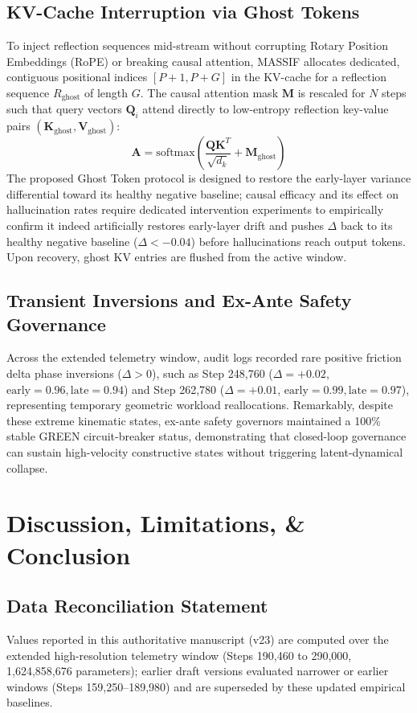 \documentclass[11pt]{article}
\begin{document}
\subsection{KV-Cache Interruption via Ghost Tokens}
To inject reflection sequences mid-stream without corrupting Rotary Position Embeddings (RoPE) or breaking causal attention, MASSIF allocates dedicated, contiguous positional indices $[P+1, P+G]$ in the KV-cache for a reflection sequence $R_{\text{ghost}}$ of length $G$. The causal attention mask $\mathbf{M}$ is rescaled for $N$ steps such that query vectors $\mathbf{Q}_i$ attend directly to low-entropy reflection key-value pairs $(\mathbf{K}_{\text{ghost}}, \mathbf{V}_{\text{ghost}})$:
\begin{equation}
\mathbf{A} = \text{softmax}\left( \frac{\mathbf{Q} \mathbf{K}^T}{\sqrt{d_k}} + \mathbf{M}_{\text{ghost}} \right)
\end{equation}
The proposed Ghost Token protocol is designed to restore the early-layer variance differential toward its healthy negative baseline; causal efficacy and its effect on hallucination rates require dedicated intervention experiments to empirically confirm it indeed artificially restores early-layer drift and pushes $\Delta$ back to its healthy negative baseline ($\Delta < -0.04$) before hallucinations reach output tokens. Upon recovery, ghost KV entries are flushed from the active window.

\subsection{Transient Inversions and Ex-Ante Safety Governance}
Across the extended telemetry window, audit logs recorded rare positive friction delta phase inversions ($\Delta > 0$), such as Step 248,760 ($\Delta = +0.02$, $\text{early}=0.96, \text{late}=0.94$) and Step 262,780 ($\Delta = +0.01$, $\text{early}=0.99, \text{late}=0.97$), representing temporary geometric workload reallocations. Remarkably, despite these extreme kinematic states, ex-ante safety governors maintained a 100\% stable \textsf{GREEN} circuit-breaker status, demonstrating that closed-loop governance can sustain high-velocity constructive states without triggering latent-dynamical collapse.

\section{Discussion, Limitations, \& Conclusion}

\subsection{Data Reconciliation Statement}
Values reported in this authoritative manuscript (v23) are computed over the extended high-resolution telemetry window (Steps 190,460 to 290,000, 1,624,858,676 parameters); earlier draft versions evaluated narrower or earlier windows (Steps 159,250--189,980) and are superseded by these updated empirical baselines.
\end{document}
